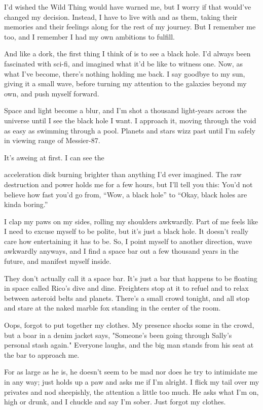 I'd wished the Wild Thing would have warned me, but I worry if that
would've changed my decision. Instead, I have to live with and as them,
taking their memories and their feelings along for the rest of my
journey. But I remember me too, and I remember I had my own ambitions to
fulfill.

And like a dork, the first thing I think of is to see a black hole. I'd
always been fascinated with sci-fi, and imagined what it'd be like to
witness one. Now, as what I've become, there's nothing holding me back.
I say goodbye to my sun, giving it a small wave, before turning my
attention to the galaxies beyond my own, and push myself forward.

Space and light become a blur, and I'm shot a thousand light-years
across the universe until I see the black hole I want. I approach it,
moving through the void as easy as swimming through a pool. Planets and
stars wizz past until I'm safely in viewing range of Messier-87.

It's aweing at first. I can see the

acceleration disk burning brighter than anything I'd ever imagined. The
raw destruction and power holds me for a few hours, but I'll tell you
this: You'd not believe how fast you'd go from, ``Wow, a black hole'' to
``Okay, black holes are kinda boring.''

I clap my paws on my sides, rolling my shoulders awkwardly. Part of me
feels like I need to excuse myself to be polite, but it's just a black
hole. It doesn't really care how entertaining it has to be. So, I point
myself to another direction, wave awkwardly anyways, and I find a space
bar out a few thousand years in the future, and manifest myself inside.

They don't actually call it a space bar. It's just a bar that happens to
be floating in space called Rico's dive and dine. Freighters stop at it
to refuel and to relax between asteroid belts and planets. There's a
small crowd tonight, and all stop and stare at the naked marble fox
standing in the center of the room.

Oops, forgot to put together my clothes. My presence shocks some in the
crowd, but a boar in a denim jacket says, "Someone's been going through
Sally's personal stash again." Everyone laughs, and the big man stands
from his seat at the bar to approach me.

For as large as he is, he doesn't seem to be mad nor does he try to
intimidate me in any way; just holds up a paw and asks me if I'm
alright. I flick my tail over my privates and nod sheepishly, the
attention a little too much. He asks what I'm on, high or drunk, and I
chuckle and say I'm sober. Just forgot my clothes.

